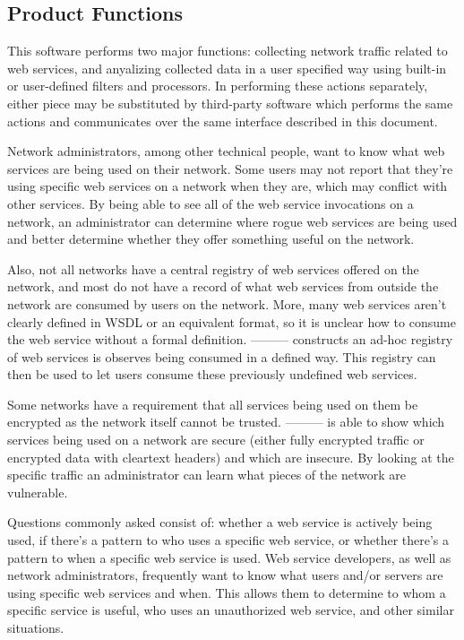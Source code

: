 \documentclass[titlepage]{article}
\begin{document}
\subsection{Product Functions%
  \label{product-functions}%
}

This software performs two major functions: collecting network traffic related
to web services, and anyalizing collected data in a user specified
way using built-in or user-defined filters and processors.  In performing these
actions separately, either piece may be substituted by third-party software
which performs the same actions and communicates over the same interface
described in this document.  

Network administrators, among other technical people, want to know what web
services are being used on their network.  Some users may not report that
they're using specific web services on a network when they are, which may 
conflict with other services.  By being able to see all of the web service
invocations on a network, an administrator can determine where rogue web
services are being used and better determine whether they offer something
useful on the network.  

Also, not all networks have a central registry of web services offered on the
network, and most do not have a record of what web services from outside the
network are consumed by users on the network.  More, many web services aren't
clearly defined in WSDL or an equivalent format, so it is unclear how to consume
the web service without a formal definition.  --------- constructs an
ad-hoc registry of web services is observes being consumed in a defined way.
This registry can then be used to let users consume these previously undefined
web services.

Some networks have a requirement that all services being used on them be
encrypted as the network itself cannot be trusted.  --------- is able to
show which services being used on a network are secure (either fully encrypted
traffic or encrypted data with cleartext headers) and which are insecure.  By
looking at the specific traffic an administrator can learn what pieces of the
network are vulnerable.

Questions commonly asked consist of: whether a web service is actively being used, if
there's a pattern to who uses a specific web service, or whether there's a
pattern to when a specific web service is used.  Web service developers,
as well as network administrators, frequently want to know what users and/or
servers are using specific web services and when.  This allows them to
determine to whom a specific service is useful, who uses an unauthorized web
service, and other similar situations.
\end{document}
